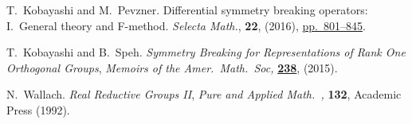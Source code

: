 \documentclass[reqno,12pt]{pja00} %
\theoremstyle{plain}
\theoremstyle{definition}
\theoremstyle{exampstyle} \newtheorem{examp}[theorem]{Theorem}
\begin{document}
\begin{thebibliography}{14}
T.~Kobayashi and M.~Pevzner.
\newblock Differential symmetry breaking operators: I.~{G}eneral theory and
  {F}-method.
\newblock \emph{{\normalfont Selecta Math.}}, \textbf{22}, (2016),
\href{http://dx.doi.org/10.1007/s00029-015-0207-9}{pp.~801--845}.

T.~Kobayashi and B.~Speh.
\newblock \emph{Symmetry {B}reaking for {R}epresentations of {R}ank {O}ne
  {O}rthogonal {G}roups}, \emph{{\normalfont Memoirs of the Amer.~Math.~Soc},}
  \textbf{\href{http://dx.doi.org/10.1090/memo/1126}{238}}, (2015).

N.~Wallach.
\newblock \emph{Real Reductive Groups II}, \emph{{\normalfont Pure and Applied
  Math.~},} \textbf{132},
\newblock Academic {P}ress (1992).

\end{thebibliography}
\end{document}
